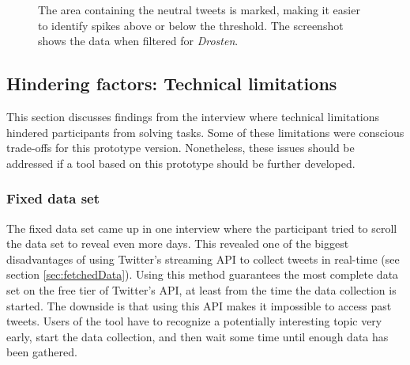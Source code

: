 \begin{figure}[h!tb]
    \centering
    \caption{The area containing the neutral tweets is marked, making it easier to identify spikes above or below the threshold. The screenshot shows the data when filtered for \emph{Drosten}.}
    \label{fig:sentiment_neutral_area}
\end{figure}

\subsection{Hindering factors: Technical limitations}
This section discusses findings from the interview where technical limitations hindered participants from solving tasks. Some of these limitations were conscious trade-offs for this prototype version. Nonetheless, these issues should be addressed if a tool based on this prototype should be further developed.

\subsubsection*{Fixed data set} \label{sec:fixedDataSet}
The fixed data set came up in one interview where the participant tried to scroll the data set to reveal even more days. This revealed one of the biggest disadvantages of using Twitter's streaming API to collect tweets in real-time (see section \ref{sec:fetchedData}). Using this method guarantees the most complete data set on the free tier of Twitter's API, at least from the time the data collection is started. The downside is that using this API makes it impossible to access past tweets. Users of the tool have to recognize a potentially interesting topic very early, start the data collection, and then wait some time until enough data has been gathered.

